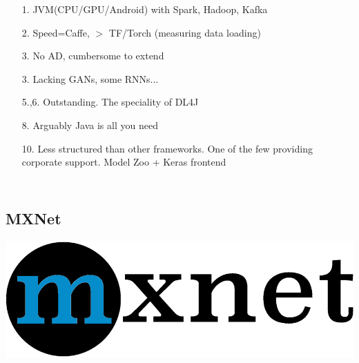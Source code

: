 \documentclass[hyperref={pdfpagelabels=false}]{beamer}
\begin{document}
\begin{frame}
\begin{columns}[t]
\begin{tikzpicture}
         \end{tikzpicture}
         \begin{itemize}
         \item[\scriptsize{\textcolor{visiblered}{1.}}] \scriptsize{JVM(CPU/GPU/Android) with Spark, Hadoop, Kafka}
         \item[\scriptsize{\textcolor{visiblered}{2.}}] \scriptsize{Speed=Caffe, $>$ TF/Torch (measuring data loading)\cite{dl4j-review}}
         \item[\scriptsize{\textcolor{visiblegreen}{3.}}] \scriptsize{No AD, cumbersome to extend}
         \item[\scriptsize{\textcolor{visiblegreen}{3.}}] \scriptsize{Lacking GANs, some RNNs...}
         \item[\scriptsize{\textcolor{visiblegreen}{5.,6.}}] \scriptsize{Outstanding. The speciality of DL4J}
         \item[\scriptsize{\textcolor{visibleblue}{8.}}] \scriptsize{Arguably Java is all you need}
         \item[\scriptsize{\textcolor{visibleblue}{10.}}] \scriptsize{Less structured than other frameworks\cite{dl4j-devguide}. One of the few providing corporate support. Model Zoo + Keras frontend}
         \end{itemize}
          \end{columns}
     \end{frame}


     

     \subsection{MXNet} %
     \begin{frame}[c] %
       \begin{center}
         \vspace{8mm}
         \includegraphics[scale=0.14]{logo_mxnet.png}
       \end{center}
     \end{frame}
\end{document}
